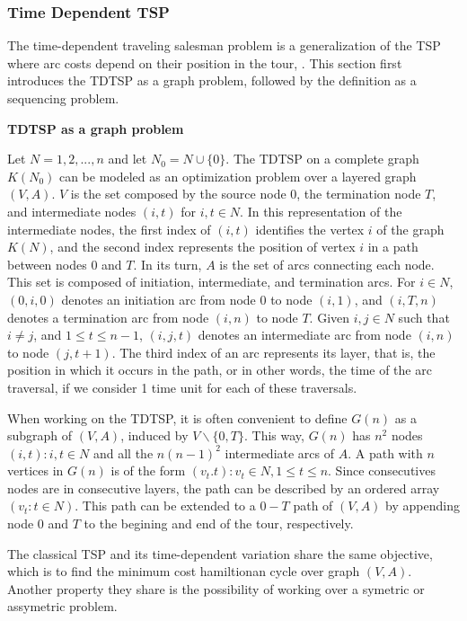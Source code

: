\subsubsection{Time Dependent TSP}
\label{sec:time-dependent-tsp}

The time-dependent traveling salesman problem is a generalization 
of the TSP where arc costs depend on their position in the tour, \cite{time_dependent_tsp, tdtsp_single_machine}.
This section first introduces the TDTSP as a graph problem,
followed by the definition as a sequencing problem. 

\textbf{TDTSP as a graph problem}

Let $N = {1, 2, ..., n}$ and let $N_{0} = N \cup \{0\}$.
The TDTSP on a complete graph $K(N_{0})$ can be modeled 
as an optimization problem over a layered graph $(V, A)$.
$V$ is the set composed by the source node $0$, the termination node $T$,
and intermediate nodes $(i, t)$ for $i, t \in N$.
In this representation of the intermediate nodes,
the first index of $(i, t)$ identifies the vertex $i$ of the graph $K(N)$,
and the second index represents the position of vertex $i$ in a path between nodes $0$ and $T$.
In its turn, $A$ is the set of arcs connecting each node.
This set is composed of initiation, intermediate, and termination arcs.
For $i \in N$, $(0, i, 0)$ denotes an initiation arc from node 0 to node $(i, 1)$,
and $(i, T, n)$ denotes a termination arc from node $(i, n)$ to node $T$.
Given $i, j \in N$ such that $i \neq j$, and $1 \leq t \leq n-1$,
$(i,j,t)$ denotes an intermediate arc from node $(i,n)$ to node $(j, t+1)$.
The third index of an arc represents its layer, that is,
the position in which it occurs in the path, or in other words, the time 
of the arc traversal, if we consider 1 time unit for each of these traversals.

When working on the TDTSP, it is often convenient to define $G(n)$ as a subgraph 
of $(V, A)$, induced by $V\backslash\{0, T\}$. This way, $G(n)$ has $n^2$ nodes 
${(i, t): i, t \in N}$ and all the $n(n-1)^2$ intermediate arcs of $A$.
A path with $n$ vertices in $G(n)$ is of the form ${(v_{t}. t): v_{t} \in N, 1 \leq t \leq n}$.
Since consecutives nodes are in consecutive layers,
the path can be described by an ordered array $(v_{t}: t \in N)$.
This path can be extended to a $0-T$ path of $(V,A)$ by appending
node $0$ and $T$ to the begining and end of the tour, respectively.

The classical TSP and its time-dependent variation share the same objective, 
which is to find the minimum cost hamiltionan cycle over graph $(V, A)$.
Another property they share is the possibility of working over 
a symetric or assymetric problem.


